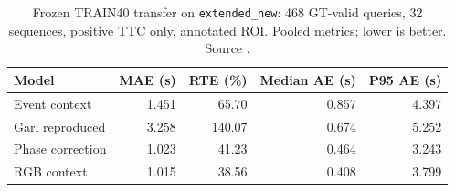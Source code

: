 \begin{table}[H]
\centering\small
\caption{Frozen TRAIN40 transfer on \texttt{extended\_new}: 468 GT-valid queries, 32 sequences, positive TTC only, annotated ROI. Pooled metrics; lower is better. Source .}
\label{tab:late-transfer}
\begin{tabular}{lrrrr}
\toprule
\textbf{Model} & \textbf{MAE (s)} & \textbf{RTE (\%)} & \textbf{Median AE (s)} & \textbf{P95 AE (s)} \\
\midrule
Event context & 1.451 & 65.70 & 0.857 & 4.397 \\
Garl reproduced & 3.258 & 140.07 & 0.674 & 5.252 \\
Phase correction & 1.023 & 41.23 & 0.464 & 3.243 \\
RGB context & 1.015 & 38.56 & 0.408 & 3.799 \\
\bottomrule
\end{tabular}
\end{table}
